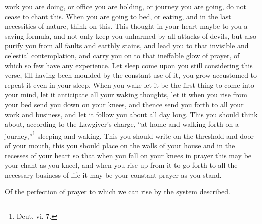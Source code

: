 work you are doing, or office you are holding, or journey you are going, do not cease to chant this. When you are going to bed, or eating, and in the last necessities of nature, think on this. This thought in your heart maybe to you a saving formula, and not only keep you unharmed by all attacks of devils, but also purify you from all faults and earthly stains, and lead you to that invisible and celestial contemplation, and carry you on to that ineffable glow of prayer, of which so few have any experience. Let sleep come upon you still considering this verse, till having been moulded by the constant use of it, you grow accustomed to repeat it even in your sleep. When you wake let it be the first thing to come into your mind, let it anticipate all your waking thoughts, let it when you rise from your bed send you down on your knees, and thence send you forth to all your work and business, and let it follow you about all day long. This you should think about, according to the Lawgiver’s charge, “at home and walking forth on a journey,”\footnote{Deut. vi. 7.} sleeping and waking. This you should write on the threshold and door of your mouth, this you should place on the walls of your house and in the recesses of your heart so that when you fall on your knees in prayer this may be your chant as you kneel, and when you rise up from it to go forth to all the necessary business of life it may be your constant prayer as you stand.


Of the perfection of prayer to which we can rise by the system described.

